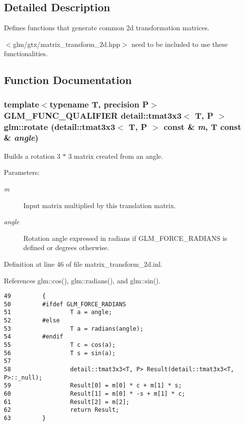 \subsection{Detailed Description}
Defines functions that generate common 2d transformation matrices. 

$<$glm/gtx/matrix\_\-transform\_\-2d.hpp$>$ need to be included to use these functionalities. 

\subsection{Function Documentation}
\hypertarget{group__gtx__matrix__transform__2d_gcfd972a1747f367837d62e00be5d841e}{
\subsubsection[rotate]{\setlength{\rightskip}{0pt plus 5cm}template$<$typename T, precision P$>$ GLM\_\-FUNC\_\-QUALIFIER detail::tmat3x3$<$ T, P $>$ glm::rotate (detail::tmat3x3$<$ T, P $>$ const \& {\em m}, \/  T const \& {\em angle})}}
\label{group__gtx__matrix__transform__2d_gcfd972a1747f367837d62e00be5d841e}


Builds a rotation 3 $\ast$ 3 matrix created from an angle.

\begin{Desc}
\item[Parameters:]
\begin{description}
\item[{\em m}]Input matrix multiplied by this translation matrix. \item[{\em angle}]Rotation angle expressed in radians if GLM\_\-FORCE\_\-RADIANS is defined or degrees otherwise. \end{description}
\end{Desc}


Definition at line 46 of file matrix\_\-transform\_\-2d.inl.

References glm::cos(), glm::radians(), and glm::sin().

\begin{Code}\begin{verbatim}49         {
50         #ifdef GLM_FORCE_RADIANS
51                 T a = angle;
52         #else
53                 T a = radians(angle);           
54         #endif
55                 T c = cos(a);
56                 T s = sin(a);
57 
58                 detail::tmat3x3<T, P> Result(detail::tmat3x3<T, P>::_null);
59                 Result[0] = m[0] * c + m[1] * s;
60                 Result[1] = m[0] * -s + m[1] * c;
61                 Result[2] = m[2];
62                 return Result;
63         }
\end{verbatim}
\end{Code}




